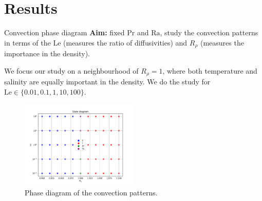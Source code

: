 \documentclass[10pt]{beamer}
\def\Ra{\mathrm{Ra}}
\def\Pr{\mathrm{Pr}}
\def\Le{\mathrm{Le}}
\begin{document}
\section{Results}

\begin{frame}{Convection phase diagram}
  \textbf{Aim:} fixed $\Pr$ and $\Ra$, study the convection patterns in terms of the $\Le$ (measures the ratio of diffusivities) and $R_{\rho}$ (measures the importance in the density).

  We focus our study on a neighbourhood of $R_{\rho} = 1$, where both temperature and salinity are equally important in the density. We do the study for $\Le\in \{0.01,0.1,1,10,100\}$.
  \begin{figure}
    \centering
    \includegraphics[width=0.5\textwidth]{images/phase_diagram.pdf}
    \caption{Phase diagram of the convection patterns.}
  \end{figure}


\end{frame}
\end{document}
